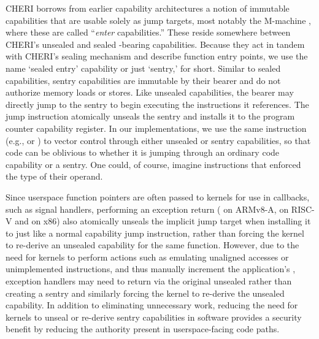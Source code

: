 CHERI borrows from earlier capability architectures a notion of immutable
capabilities that are usable solely as jump targets, most notably the
M-machine \cite{carter:mmachine94}, where these are called ``\emph{enter}
capabilities.''
%
These reside somewhere between CHERI's unsealed and sealed
\cappermX-bearing capabilities.  Because they act in tandem with
CHERI's sealing mechanism and describe function entry points, we use the
name `sealed entry' capability or just `sentry,' for short.
%
Similar to sealed capabilities, sentry capabilities are immutable by their
bearer and do not authorize memory loads or stores.  Like unsealed
capabilities, the bearer may directly jump to the sentry to begin executing
the instructions it references.  The jump instruction atomically unseals the
sentry and installs it to the program counter capability register.  In our
implementations, we use the same instruction (e.g.,  or
) to vector control through either unsealed or sentry
capabilities, so that code can be oblivious to whether it is jumping through
an ordinary code capability or a sentry.  One could, of course, imagine
instructions that enforced the type of their operand.

Since userspace function pointers are often passed to kernels for use in
callbacks, such as signal handlers, performing an exception return
( on ARMv8-A, \xRET{} on RISC-V and
 on x86) also atomically unseals the implicit jump target
when installing it to \PCC{} just like a normal capability jump instruction,
rather than forcing the kernel to re-derive an unsealed capability for the same
function. However, due to the need for kernels to perform actions such as
emulating unaligned accesses or unimplemented instructions, and thus manually
increment the application's \PCC{}, exception handlers may need to
return via the original unsealed
\PCC{} rather than creating a sentry and similarly forcing the
kernel to re-derive the unsealed capability. In addition to eliminating
unnecessary work, reducing the need for kernels to unseal or re-derive sentry
capabilities in software provides a security benefit by reducing the authority
present in userspace-facing code paths.

